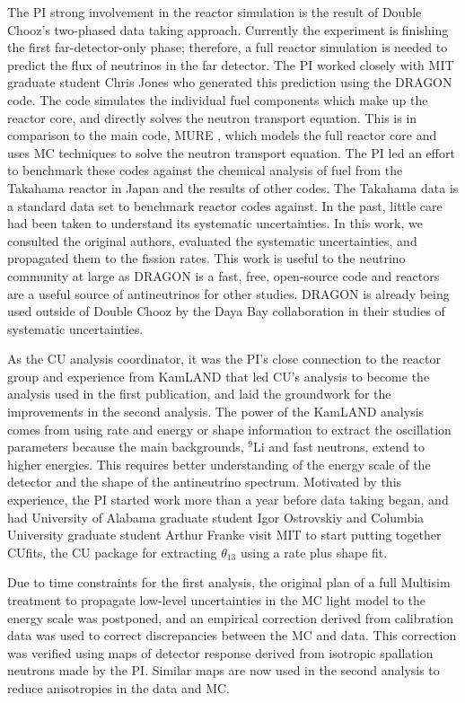 The PI strong involvement in the reactor simulation is the result of Double Chooz's two-phased data taking approach. Currently the experiment is finishing the first far-detector-only phase; therefore, a full reactor simulation is needed to predict the flux of neutrinos in the far detector. The PI worked closely with MIT graduate student Chris Jones who generated this prediction using the DRAGON code\cite{DRAGON1994}. The code simulates the individual fuel components which make up the reactor core, and directly solves the neutron transport equation. This is in comparison to the main code, MURE\cite{MURECode,Meplan2005} , which models the full reactor core and uses MC techniques to solve the neutron transport equation. The PI led an effort to benchmark these codes against the chemical analysis of fuel from the Takahama reactor in Japan and the results of other codes\cite{takahama}. The Takahama data is a standard data set to benchmark reactor codes against. In the past, little care had been taken to understand its systematic uncertainties. In this work, we consulted the original authors, evaluated the systematic uncertainties, and propagated them to the fission rates. This work is useful to the neutrino community at large as DRAGON is a fast, free, open-source code and reactors are a useful source of antineutrinos for other studies. DRAGON is already being used outside of Double Chooz by the Daya Bay collaboration in their studies of systematic uncertainties\cite{dayabay}.

As the CU analysis coordinator, it was the PI's close connection to the reactor group and experience from KamLAND that led CU's analysis to become the analysis used in the first publication\cite{dcone}, and laid the groundwork for the improvements in the second analysis\cite{dctwo}. The power of the KamLAND analysis comes from using rate and energy or shape information to extract the oscillation parameters because the main backgrounds, $^{9}$Li and fast neutrons, extend to higher energies. This requires better understanding of the energy scale of the detector and the shape of the antineutrino spectrum. Motivated by this experience, the PI started work more than a year before data taking began, and had University of Alabama graduate student Igor Ostrovskiy and Columbia University graduate student Arthur Franke visit  MIT to start putting together CUfits, the CU package for extracting $\theta_{13}$ using a rate plus shape fit.

Due to time constraints for the first analysis, the original plan of a full Multisim treatment to propagate low-level uncertainties in the MC light model to the energy scale was postponed, and an empirical correction derived from calibration data was used to correct discrepancies between the MC and data. This correction was verified using maps of detector response derived from isotropic spallation neutrons made by the PI. Similar maps are now used in the second analysis to reduce anisotropies in the data and MC. 

